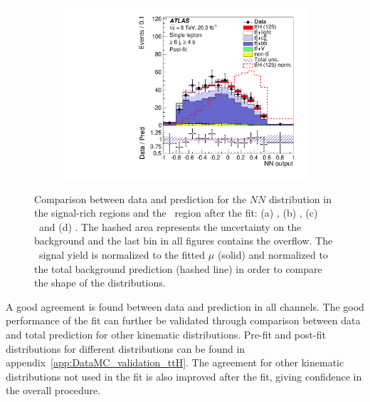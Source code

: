 \begin{figure}[tpb!]
\begin{subfigure}{0.49\textwidth}
  \caption{}\end{subfigure}
  \begin{subfigure}{0.49\textwidth}
  \includegraphics[width=\textwidth]{Analysis/Figures_ttH/NN_6jetin4btagin8TeV.pdf}
  \caption{}\end{subfigure}
  \caption{Comparison between data and prediction for the $NN$ distribution in the signal-rich regions and the \fivethree\ region after the fit:
  (a) \fivethree, (b) \fivefour, (c) \sixthree\ and (d) \sixfour.
The hashed area represents the uncertainty on the background and the last bin in all figures contains the overflow. 
The \tth\ signal yield is  normalized to the fitted $\mu$ (solid) and normalized to the total background prediction (hashed line) in order to compare the shape of the distributions.
}
  \label{fig:postfit_ttH_2}
\end{figure}


A good agreement is found between data and prediction in all channels. The good performance of the fit can further be validated through comparison between data and total prediction for other kinematic distributions. Pre-fit and post-fit distributions for different distributions can be found in appendix~\ref{app:DataMC_validation_ttH}. 
The agreement for other kinematic distributions not used in the fit is also improved
after the fit, giving confidence in the overall procedure.

